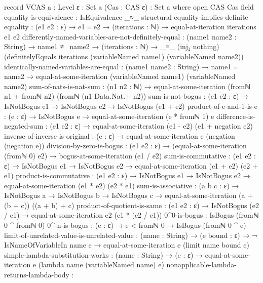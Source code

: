 \documentclass{report}
\begin{document}
\begin{code}
record VCAS {a : Level} {ε : Set a} (Cas : CAS ε) : Set a where
  open CAS Cas
  field
    equality-is-equivalence : IsEquivalence _≈_
    structural-equality-implies-definite-equality :
      (e1 e2 : ε) →
      e1 ≡ e2 →
      (iterations : ℕ) →
      equal-at-iteration iterations e1 e2
    differently-named-variables-are-not-definitely-equal :
      (name1 name2 : String) →
      name1 ≢ name2 →
      (iterations : ℕ) →
      _≡_ (inj₂ nothing)
          (definitelyEquals iterations
                            (variableNamed name1)
                            (variableNamed name2))
    identically-named-variables-are-equal :
      (name1 name2 : String) →
      name1 ≡ name2 →
      equal-at-some-iteration (variableNamed name1) (variableNamed name2)
    sum-of-nats-is-nat-sum :
      (n1 n2 : ℕ) →
      equal-at-some-iteration (fromℕ n1 + fromℕ n2) (fromℕ (n1 Data.Nat.+ n2))
    sum-is-not-bogus :
      (e1 e2 : ε) →
      IsNotBogus e1 →
      IsNotBogus e2 →
      IsNotBogus (e1 + e2)
    product-of-e-and-1-is-e :
      (e : ε) →
      IsNotBogus e →
      equal-at-some-iteration (e * fromℕ 1) e
    difference-is-negated-sum :
      (e1 e2 : ε) →
      equal-at-some-iteration (e1 - e2)
                              (e1 + negation e2)
    inverse-of-inverse-is-original :
      (e : ε) →
      equal-at-some-iteration e (negation (negation e))
    division-by-zero-is-bogus :
      (e1 e2 : ε) →
      (equal-at-some-iteration (fromℕ 0) e2) →
      bogus-at-some-iteration (e1 / e2)
    sum-is-commutative :
      (e1 e2 : ε) →
      IsNotBogus e1 →
      IsNotBogus e2 →
      equal-at-some-iteration (e1 + e2) (e2 + e1)
    product-is-commutative :
      (e1 e2 : ε) →
      IsNotBogus e1 →
      IsNotBogus e2 →
      equal-at-some-iteration (e1 * e2) (e2 * e1)
    sum-is-associative :
      (a b c : ε) →
      IsNotBogus a →
      IsNotBogus b →
      IsNotBogus c →
      equal-at-some-iteration (a + (b + c)) ((a + b) + c)
    product-of-quotient-is-same :
      (e1 e2 : ε) →
      IsNotBogus (e2 / e1) →
      equal-at-some-iteration e2 (e1 * (e2 / e1))
    0^0-is-bogus : IsBogus (fromℕ 0 ^ fromℕ 0)
    0^-n-is-bogus : (e : ε) → e < fromℕ 0 → IsBogus (fromℕ 0 ^ e)
    limit-of-unrelated-value-is-unrelated-value :
      (name : String) →
      (e bound : ε) →
      ¬ IsNameOfVariableIn name e →
      equal-at-some-iteration e (limit name bound e)
    simple-lambda-substitution-works :
      (name : String) →
      (e : ε) →
      equal-at-some-iteration e (lambda name (variableNamed name) e)
    nonapplicable-lambda-returns-lambda-body :

\end{code}
\end{document}

